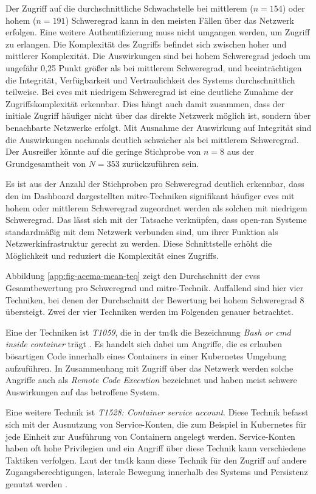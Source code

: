 \par Der Zugriff auf die durchschnittliche Schwachstelle bei mittlerem (\(n = 154\)) oder hohem (\(n = 191\)) Schweregrad kann in den meisten Fällen über das Netzwerk erfolgen. Eine weitere Authentifizierung muss nicht umgangen werden, um Zugriff zu erlangen. Die Komplexität des Zugriffs befindet sich zwischen hoher und mittlerer Komplexität. Die Auswirkungen sind bei hohem Schweregrad jedoch um ungefähr 0,25 Punkt größer als bei mittlerem Schweregrad, und beeinträchtigen die Integrität, Verfügbarkeit und Vertraulichkeit des Systems durchschnittlich teilweise. Bei \glspl{cve} mit niedrigem Schweregrad ist eine deutliche Zunahme der Zugriffskomplexität erkennbar. Dies hängt auch damit zusammen, dass der initiale Zugriff häufiger nicht über das direkte Netzwerk möglich ist, sondern über benachbarte Netzwerke erfolgt. Mit Ausnahme der Auswirkung auf Integrität sind die Auswirkungen nochmals deutlich schwächer als bei mittlerem Schweregrad. Der Ausreißer könnte auf die geringe Stichprobe von \(n = 8\) aus der Grundgesamtheit von \(N = 353\) zurückzuführen sein.
\par Es ist aus der Anzahl der Stichproben pro Schweregrad deutlich erkennbar, dass den im Dashboard dargestellten \gls{mitre}-Techniken signifikant häufiger \glspl{cve} mit hohem oder mittlerem Schweregrad zugeordnet werden als solchen mit niedrigem Schweregrad. Das lässt sich mit der Tatsache verknüpfen, dass \gls{open-ran} Systeme standardmäßig mit dem Netzwerk verbunden sind, um ihrer Funktion als Netzwerkinfrastruktur gerecht zu werden. Diese Schnittstelle erhöht die Möglichkeit und reduziert die Komplexität eines Zugriffs.
\par Abbildung \ref{app:fig-acema-mean-teq} zeigt den Durchschnitt der \gls{cvss} Gesamtbewertung pro Schweregrad und \gls{mitre}-Technik. Auffallend sind hier vier Techniken, bei denen der Durchschnitt der Bewertung bei hohem Schweregrad 8 übersteigt. Zwei der vier Techniken werden im Folgenden genauer betrachtet.
\par Eine der Techniken ist \textit{T1059}, die in der \gls{tm4k} die Bezeichnung \textit{Bash or cmd inside container} trägt \autocite{BashCmdContainer}. Es handelt sich dabei um Angriffe, die es erlauben bösartigen Code innerhalb eines Containers in einer Kubernetes Umgebung aufzuführen. In Zusammenhang mit Zugriff über das Netzwerk werden solche Angriffe auch als \textit{Remote Code Execution} bezeichnet und haben meist schwere Auswirkungen auf das betroffene System.
\par Eine weitere Technik ist \textit{T1528: Container service account}. Diese Technik befasst sich mit der Ausnutzung von Service-Konten, die zum Beispiel in Kubernetes für jede Einheit zur Ausführung von Containern angelegt werden. Service-Konten haben oft hohe Privilegien und ein Angriff über diese Technik kann verschiedene Taktiken verfolgen. Laut der \gls{tm4k} kann diese Technik für den Zugriff auf andere Zugangsberechtigungen, laterale Bewegung innerhalb des Systems und Persistenz genutzt werden \autocite{ContainerServiceAccount}.
